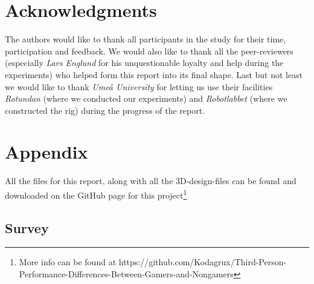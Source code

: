 \documentclass[runningheads,a4paper,oribibl]{llncs}
\begin{document}
\section{Acknowledgments}
The authors would like to thank all participants in the study for their time, participation and feedback. We would also like to thank all the peer-reviewers (especially \emph{Lars Englund} for his unquestionable loyalty and help during the experiments) who helped form this report into its final shape. Last but not least we would like to thank \emph{Umeå University} for letting us use their facilities \emph{Rotundan} (where we conducted our experiments) and \emph{Robotlabbet} (where we constructed the rig) during the progress of the report.








%



\appendix

\section{Appendix}
All the files for this report, along with all the 3D-design-files can be found and downloaded on the GitHub page for this project\footnote{More info can be found at https://github.com/Kodagrux/Third-Person-Performance-Differences-Between-Gamers-and-Nongamers} 
\subsection{Survey} \label{subsec:Survey}

\end{document}
